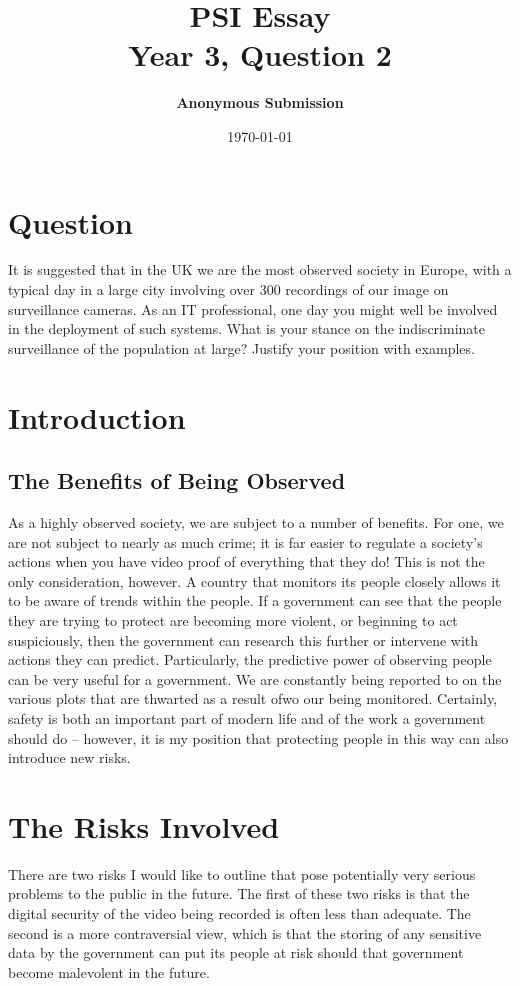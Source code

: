 \documentclass[10pt, draft]{article}
\author{\textbf{Anonymous Submission}}
\date{\today}
\title{PSI Essay \\
Year 3, Question 2 \\
}
\begin{document}
\maketitle

\section{Question} \par
It is suggested that in the UK we are the most observed society in Europe, with a typical day in a large city involving over 300 recordings of our image on surveillance cameras. As an IT professional, one day you might well be involved in the deployment of such systems. What is your stance on the indiscriminate surveillance of the population at large? Justify your position with examples. \par

\section{Introduction} \par
\subsection{The Benefits of Being Observed} \par
As a highly observed society, we are subject to a number of benefits. For one, we are not subject to nearly as much crime; it is far easier to regulate a society's actions when you have video proof of everything that they do! This is not the only consideration, however. A country that monitors its people closely allows it to be aware of trends within the people. If a government can see that the people they are trying to protect are becoming more violent, or beginning to act suspiciously, then the government can research this further or intervene with actions they can predict. Particularly, the predictive power of observing people can be very useful for a government. We are constantly being reported to on the various plots that are thwarted as a result ofwo our being monitored. Certainly, safety is both an important part of modern life and of the work a government should do -- however, it is my position that protecting people in this way can also introduce new risks. \par

\section{The Risks Involved}\par
There are two risks I would like to outline that pose potentially very serious problems to the public in the future. The first of these two risks is that the digital security of the video being recorded is often less than adequate. The second is a more contraversial view, which is that the storing of any sensitive data by the government can put its people at risk should that government become malevolent in the future.\par
\end{document}
